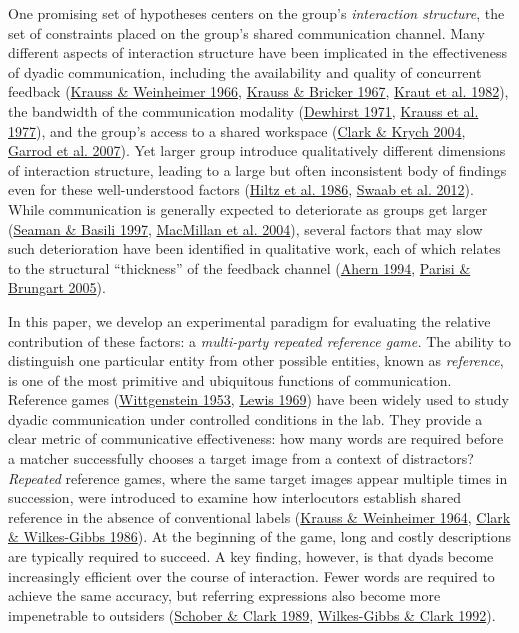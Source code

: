 \documentclass[
  english,
]{article}
\begin{document}
One promising set of hypotheses centers on the group's \emph{interaction structure}, the set of constraints placed on the group's shared communication channel.
Many different aspects of interaction structure have been implicated in the effectiveness of dyadic communication, including the availability and quality of concurrent feedback (\protect\hyperlink{ref-krauss1966}{Krauss \& Weinheimer 1966}, \protect\hyperlink{ref-KraussBricker67_Delay}{Krauss \& Bricker 1967}, \protect\hyperlink{ref-kraut1982listener}{Kraut et al. 1982}), the bandwidth of the communication modality (\protect\hyperlink{ref-dewhirst1971influence}{Dewhirst 1971}, \protect\hyperlink{ref-KraussEtAl77}{Krauss et al. 1977}), and the group's access to a shared workspace (\protect\hyperlink{ref-clark2004speaking}{Clark \& Krych 2004}, \protect\hyperlink{ref-garrod2007foundations}{Garrod et al. 2007}).
Yet larger group introduce qualitatively different dimensions of interaction structure, leading to a large but often inconsistent body of findings even for these well-understood factors (\protect\hyperlink{ref-hiltz1986experiments}{Hiltz et al. 1986}, \protect\hyperlink{ref-swaab2012communication}{Swaab et al. 2012}).
While communication is generally expected to deteriorate as groups get larger (\protect\hyperlink{ref-seaman1997communication}{Seaman \& Basili 1997}, \protect\hyperlink{ref-macmillan_communication_2004}{MacMillan et al. 2004}), several factors that may slow such deterioration have been identified in qualitative work, each of which relates to the structural ``thickness'' of the feedback channel (\protect\hyperlink{ref-ahern1994effect}{Ahern 1994}, \protect\hyperlink{ref-parisi2005evaluating}{Parisi \& Brungart 2005}).

In this paper, we develop an experimental paradigm for evaluating the relative contribution of these factors: a \emph{multi-party repeated reference game.}
The ability to distinguish one particular entity from other possible entities, known as \emph{reference}, is one of the most primitive and ubiquitous functions of communication.
Reference games (\protect\hyperlink{ref-Wittgenstein1953}{Wittgenstein 1953}, \protect\hyperlink{ref-lewis1969convention}{Lewis 1969}) have been widely used to study dyadic communication under controlled conditions in the lab.
They provide a clear metric of communicative effectiveness: how many words are required before a matcher successfully chooses a target image from a context of distractors?
\emph{Repeated} reference games, where the same target images appear multiple times in succession, were introduced to examine how interlocutors establish shared reference in the absence of conventional labels (\protect\hyperlink{ref-krauss1964}{Krauss \& Weinheimer 1964}, \protect\hyperlink{ref-clark1986}{Clark \& Wilkes-Gibbs 1986}).
At the beginning of the game, long and costly descriptions are typically required to succeed.
A key finding, however, is that dyads become increasingly efficient over the course of interaction.
Fewer words are required to achieve the same accuracy, but referring expressions also become more impenetrable to outsiders (\protect\hyperlink{ref-schober1989}{Schober \& Clark 1989}, \protect\hyperlink{ref-wilkes1992coordinating}{Wilkes-Gibbs \& Clark 1992}).
\end{document}
